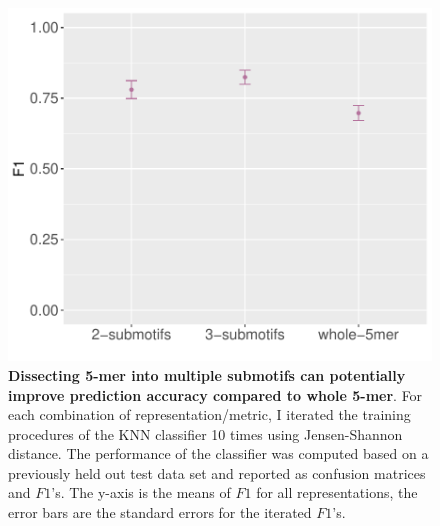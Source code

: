\begin{figure}[h!]
\centering
    \includegraphics[scale=0.8]{graphics/f1_sce_submotif.pdf}
    \caption{\textbf{Dissecting 5-mer into multiple submotifs can potentially improve prediction accuracy compared to whole 5-mer}. For each combination of representation/metric, I iterated the training procedures of the KNN classifier 10 times using Jensen-Shannon distance. The performance of the classifier was computed based on a previously held out test data set and reported as confusion matrices and $F1$'s. The y-axis is the means of $F1$ for all representations, the error bars are the standard errors for the iterated $F1$’s.}
    \label{fig:f1_sce_submotif}
\end{figure}
